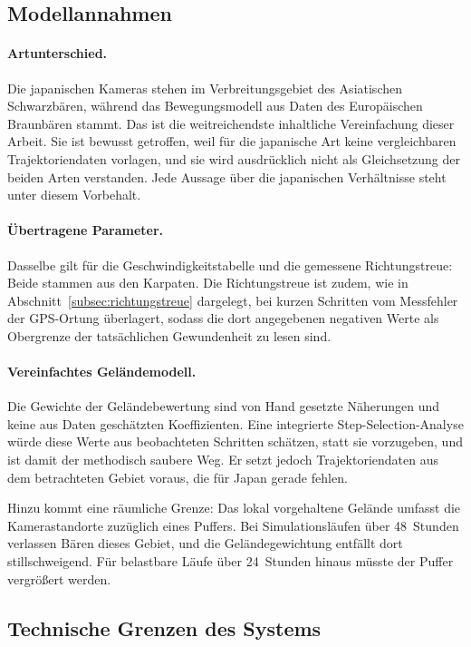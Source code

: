 \documentclass[12pt,a4paper]{report}
\begin{document}
\subsection{Modellannahmen}
\label{subsec:limit-modell}

\paragraph{Artunterschied.} Die japanischen Kameras stehen im Verbreitungsgebiet des
Asiatischen Schwarzbären, während das Bewegungsmodell aus Daten des Europäischen Braunbären
stammt. Das ist die weitreichendste inhaltliche Vereinfachung dieser Arbeit. Sie ist bewusst
getroffen, weil für die japanische Art keine vergleichbaren Trajektoriendaten vorlagen, und
sie wird ausdrücklich nicht als Gleichsetzung der beiden Arten verstanden. Jede Aussage über
die japanischen Verhältnisse steht unter diesem Vorbehalt.

\paragraph{Übertragene Parameter.} Dasselbe gilt für die Geschwindigkeitstabelle und die
gemessene Richtungstreue: Beide stammen aus den Karpaten. Die Richtungstreue ist zudem, wie
in Abschnitt~\ref{subsec:richtungstreue} dargelegt, bei kurzen Schritten vom Messfehler der
GPS-Ortung überlagert, sodass die dort angegebenen negativen Werte als Obergrenze der
tatsächlichen Gewundenheit zu lesen sind.

\paragraph{Vereinfachtes Geländemodell.} Die Gewichte der Geländebewertung sind von Hand
gesetzte Näherungen und keine aus Daten geschätzten Koeffizienten. Eine integrierte
Step-Selection-Analyse \cite{Avgar2016} würde diese Werte aus beobachteten Schritten
schätzen, statt sie vorzugeben, und ist damit der methodisch saubere Weg. Er setzt jedoch
Trajektoriendaten aus dem betrachteten Gebiet voraus, die für Japan gerade fehlen.

Hinzu kommt eine räumliche Grenze: Das lokal vorgehaltene Gelände umfasst die Kamerastandorte
zuzüglich eines Puffers. Bei Simulationsläufen über 48~Stunden verlassen Bären dieses Gebiet,
und die Geländegewichtung entfällt dort stillschweigend. Für belastbare Läufe über 24~Stunden
hinaus müsste der Puffer vergrößert werden.

\subsection{Technische Grenzen des Systems}
\label{subsec:technische-grenzen}
\end{document}
